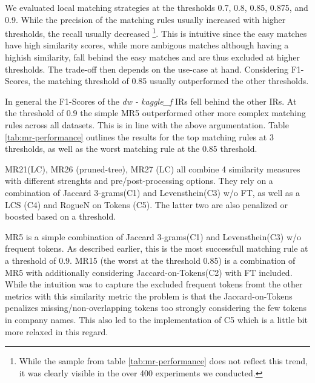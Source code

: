\documentclass[11pt,titlepage,oneside,openany]{book}
\begin{document}
We evaluated local matching strategies at the thresholds 0.7, 0.8, 0.85, 0.875, and 0.9. While the precision of the matching rules usually increased with higher thresholds, the recall usually decreased%
\footnote{While the sample from table \ref{tab:mr-performance} does not reflect this trend, it was clearly visible in the over 400 experiments we conducted.}.%
This is intuitive since the easy matches have high similarity scores, while more ambigous matches although having a highish similarity, fall behind the easy matches and are thus excluded at higher thresholds. The trade-off then depends on the use-case at hand. Considering F1-Scores, the matching threshold of 0.85 usually outperformed the other thresholds.

In general the F1-Scores of the \textit{dw - kaggle\_f} IRs fell behind the other IRs. At the threshold of 0.9 the simple MR5 outperformed other more complex matching rules across all datasets. This is in line with the above argumentation. Table \ref{tab:mr-performance} outlines the results for the top matching rules at 3 thresholds, as well as the worst matching rule at the 0.85 threshold.

MR21(LC), MR26 (pruned-tree), MR27 (LC) all combine 4 similarity measures with different strenghts and pre/post-processing options. They rely on a combination of Jaccard 3-grams(C1) and Levensthein(C3) w/o FT, as well as a LCS (C4) and RogueN on Tokens (C5). The latter two are also penalized or boosted based on a threshold.

MR5 is a simple combination of Jaccard 3-grams(C1) and Levensthein(C3) w/o frequent tokens. As described earlier, this is the most successfull matching rule at a threshold of 0.9. MR15 (the worst at the threshold 0.85) is a combination of MR5 with additionally considering Jaccard-on-Tokens(C2) with FT included. While the intuition was to capture the excluded frequent tokens fromt the other metrics with this similarity metric the problem is that the Jaccard-on-Tokens penalizes missing/non-overlapping tokens too strongly considering the few tokens in company names. This also led to the implementation of C5 which is a little bit more relaxed in this regard.
\end{document}
